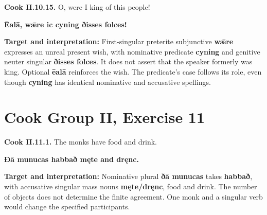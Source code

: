 \par\begin{minipage}{\linewidth}\raggedright
\textbf{Cook II.10.15.} O, were I king of this people!

\textbf{Ēalā, wǣre ic cyning ðisses folces!}

\textbf{Target and interpretation:} First-singular preterite subjunctive \textbf{wǣre} expresses an unreal present wish, with nominative predicate \textbf{cyning} and genitive neuter singular \textbf{ðisses folces}. It does not assert that the speaker formerly was king. Optional \textbf{ēalā} reinforces the wish. The predicate's case follows its role, even though \textbf{cyning} has identical nominative and accusative spellings.

\end{minipage}\par\addvspace{4pt}

\section*{Cook Group II, Exercise 11}

\par\begin{minipage}{\linewidth}\raggedright
\textbf{Cook II.11.1.} The monks have food and drink.

\textbf{Ðā munucas habbað męte and dręnc.}

\textbf{Target and interpretation:} Nominative plural \textbf{ðā munucas} takes \textbf{habbað}, with accusative singular mass nouns \textbf{męte/\allowbreak{}dręnc}, food and drink. The number of objects does not determine the finite agreement. One monk and a singular verb would change the specified participants.

\end{minipage}\par\addvspace{4pt}


